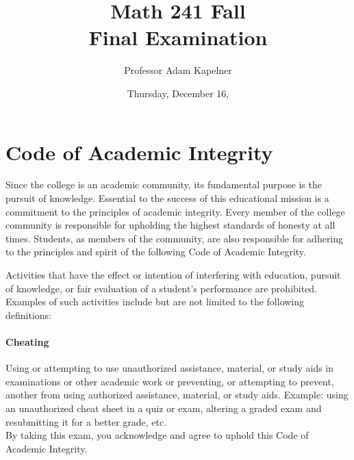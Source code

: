\documentclass[12pt,landscape]{article}
\title{Math 241 Fall \the\year{} \\ Final Examination}
\author{Professor Adam Kapelner}
\date{Thursday, December 16, \the\year{}}
\begin{document}
\maketitle


\thispagestyle{empty}

\section*{Code of Academic Integrity}

\footnotesize
Since the college is an academic community, its fundamental purpose is the pursuit of knowledge. Essential to the success of this educational mission is a commitment to the principles of academic integrity. Every member of the college community is responsible for upholding the highest standards of honesty at all times. Students, as members of the community, are also responsible for adhering to the principles and spirit of the following Code of Academic Integrity.

Activities that have the effect or intention of interfering with education, pursuit of knowledge, or fair evaluation of a student's performance are prohibited. Examples of such activities include but are not limited to the following definitions:

\paragraph{Cheating} Using or attempting to use unauthorized assistance, material, or study aids in examinations or other academic work or preventing, or attempting to prevent, another from using authorized assistance, material, or study aids. Example: using an unauthorized cheat sheet in a quiz or exam, altering a graded exam and resubmitting it for a better grade, etc.
\\

\noindent By taking this exam, you acknowledge and agree to uphold this Code of Academic Integrity. \\


\normalsize
\end{document}

